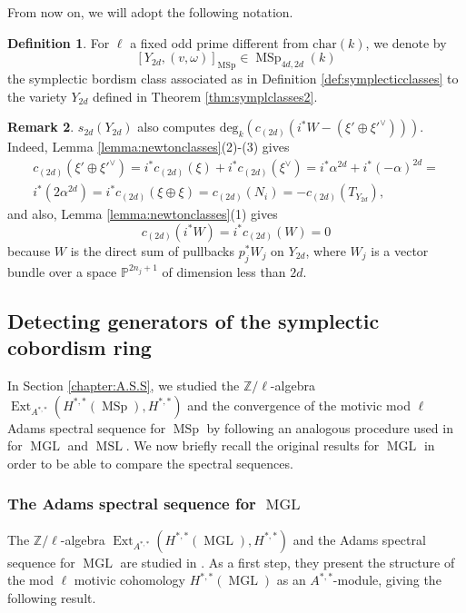 \documentclass[10pt]{amsart}
\theoremstyle{definition}
\newtheorem{defn}{Definition}[section]
\newtheorem{rmk}[defn]{Remark}
\theoremstyle{plain}
\numberwithin{equation}{section}
\newcommand{\0}{\emptyset}
\renewcommand{\P}{{\mathbb P}}
\newcommand{\Z}{{\mathbb Z}}
\newcommand{\MGL}{{\operatorname{MGL}}}
\newcommand{\MSL}{{\operatorname{MSL}}}
\newcommand{\MSp}{{\operatorname{MSp}}}
\newcommand{\Ext}{{\operatorname{Ext}}}
\begin{document}
From now on, we will adopt the following notation.

\begin{defn}
\label{defn:SymplecticY's}
    For $\ell$ a fixed odd prime different from $\text{char}(k)$, we denote by
    $$[Y_{2d}, (v,\omega)]_{\MSp} \in \MSp_{4d,2d}(k)$$
    the symplectic bordism class associated as in Definition \ref{def:symplecticclasses} to the variety $Y_{2d}$ defined in Theorem \ref{thm:symplclasses2}. 
\end{defn}

\begin{rmk}
\label{rmk:ComparingNewtonClasses}
    $s_{2d}(Y_{2d})$ also computes $\text{deg}_k(c_{(2d)}(i^*W-(\xi' \oplus \xi'^{\vee})))$. Indeed, Lemma \ref{lemma:newtonclasses}(2)-(3) gives 
    \begin{multline*}
        c_{(2d)}(\xi' \oplus \xi'^{\vee})=i^*c_{(2d)}(\xi) + i^*c_{(2d)}(\xi^{\vee})= i^*\alpha^{2d}+i^*(-\alpha)^{2d}=\\i^*(2\alpha^{2d})=i^*c_{(2d)}(\xi \oplus \xi)=c_{(2d)}(N_i)=-c_{(2d)}(T_{Y_{2d}}),
    \end{multline*}
    and also, Lemma \ref{lemma:newtonclasses}(1) gives
    $$c_{(2d)}(i^*W)=i^*c_{(2d)}(W)=0$$ because $W$ is the direct sum of pullbacks $p_j^*W_j$ on $Y_{2d}$, where $W_j$ is a vector bundle over a space $\P^{2n_j+1}$ of dimension less than $2d$.
\end{rmk}

\subsection{Detecting generators of the symplectic cobordism ring}

In Section \ref{chapter:A.S.S}, we studied the $\Z/\ell$-algebra $\Ext_{A^{*,*}}(H^{*,*}(\MSp),H^{*,*})$ and the convergence of the motivic mod $\ell$ Adams spectral sequence for $\MSp$ by following an analogous procedure used in \cite[Section 5-6]{lev:ellcoh} for $\MGL$ and $\MSL$. We now briefly recall the original results for $\MGL$ in order to be able to compare the spectral sequences.

\subsubsection{The Adams spectral sequence for $\MGL$}

The $\Z/\ell$-algebra $\Ext_{A^{*,*}}(H^{*,*}(\MGL),H^{*,*})$ and the Adams spectral sequence for $\MGL$ are studied in \cite[Sections 5-6]{lev:ellcoh}. As a first step, they present the structure of the mod $\ell$ motivic cohomology $H^{*,*}(\MGL)$ as an $A^{*,*}$-module, giving the following result.
\end{document}
